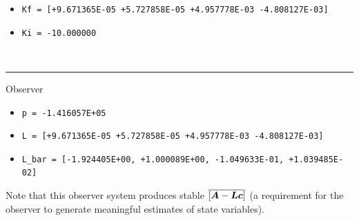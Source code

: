 \begin{itemize}
    \item \texttt{Kf = [+9.671365E-05 +5.727858E-05 +4.957778E-03 -4.808127E-03]}
    \item \texttt{Ki = -10.000000}
\end{itemize}
~\rule{\textwidth}{0.5pt}
Observer
\begin{itemize}
    \item \texttt{p = -1.416057E+05}
    \item \texttt{L = [+9.671365E-05 +5.727858E-05 +4.957778E-03 -4.808127E-03]}
    \item \texttt{L\_bar = [-1.924405E+00, +1.000089E+00, -1.049633E-01, +1.039485E-02]}
\end{itemize}
Note that this observer system produces stable $\overline{\left[\boldsymbol{A} - \boldsymbol{L}\boldsymbol{c}\right]}$ (a requirement for the observer to generate meaningful estimates of state variables).
